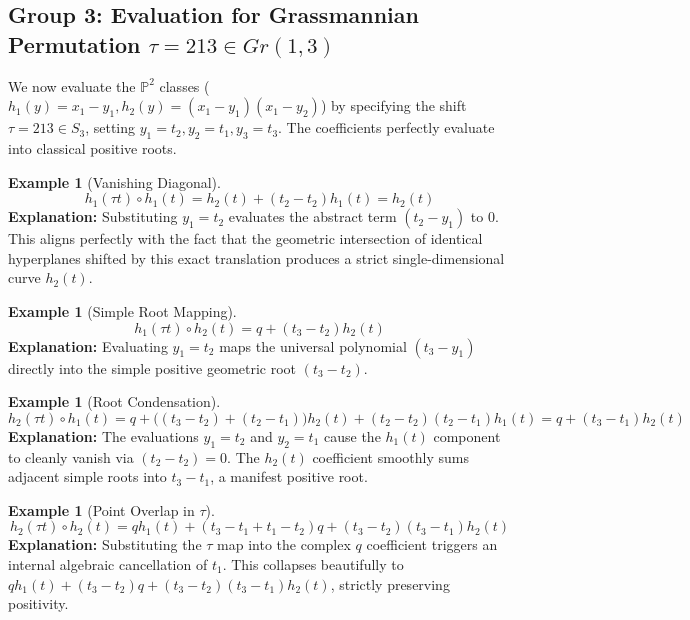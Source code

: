 \documentclass{amsart}
\theoremstyle{definition}
\newtheorem{example}[theorem]{Example}
\begin{document}
\subsection*{Group 3: Evaluation for Grassmannian Permutation $\tau = 213 \in Gr(1,3)$}
We now evaluate the $\mathbb{P}^2$ classes ($h_1(y) = x_1 - y_1, h_2(y) = (x_1 - y_1)(x_1 - y_2)$) by specifying the shift $\tau = 213 \in S_3$, setting $y_1 = t_2, y_2 = t_1, y_3 = t_3$. The coefficients perfectly evaluate into classical positive roots.
\begin{example}[Vanishing Diagonal]
$$ h_1(\tau t) \circ h_1(t) = h_2(t) + (t_2 - t_2) h_1(t) = h_2(t) $$
\textbf{Explanation:} Substituting $y_1 = t_2$ evaluates the abstract term $(t_2 - y_1)$ to $0$. This aligns perfectly with the fact that the geometric intersection of identical hyperplanes shifted by this exact translation produces a strict single-dimensional curve $h_2(t)$.
\end{example}

\begin{example}[Simple Root Mapping]
$$ h_1(\tau t) \circ h_2(t) = q + (t_3 - t_2) h_2(t) $$
\textbf{Explanation:} Evaluating $y_1 = t_2$ maps the universal polynomial $(t_3 - y_1)$ directly into the simple positive geometric root $(t_3 - t_2)$.
\end{example}

\begin{example}[Root Condensation]
$$ h_2(\tau t) \circ h_1(t) = q + \big((t_3 - t_2) + (t_2 - t_1)\big) h_2(t) + (t_2 - t_2)(t_2 - t_1) h_1(t) = q + (t_3 - t_1) h_2(t) $$
\textbf{Explanation:} The evaluations $y_1 = t_2$ and $y_2 = t_1$ cause the $h_1(t)$ component to cleanly vanish via $(t_2 - t_2)=0$. The $h_2(t)$ coefficient smoothly sums adjacent simple roots into $t_3 - t_1$, a manifest positive root.
\end{example}

\begin{example}[Point Overlap in $\tau$]
$$ h_2(\tau t) \circ h_2(t) = q h_1(t) + (t_3 - t_1 + t_1 - t_2) q + (t_3 - t_2)(t_3 - t_1) h_2(t) $$
\textbf{Explanation:} Substituting the $\tau$ map into the complex $q$ coefficient triggers an internal algebraic cancellation of $t_1$. This collapses beautifully to $q h_1(t) + (t_3 - t_2) q + (t_3 - t_2)(t_3 - t_1) h_2(t)$, strictly preserving positivity.
\end{example}
\end{document}
